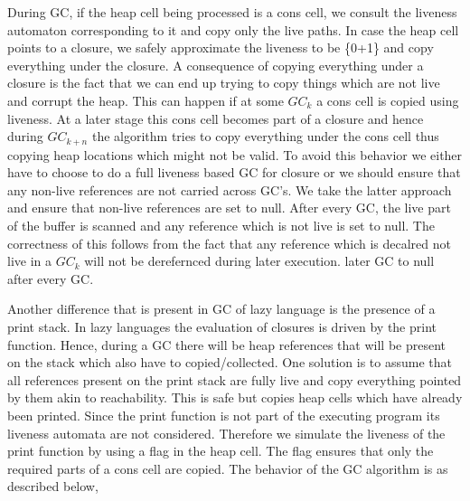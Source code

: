 \documentclass[9pt]{sigplanconf}
\newcommand{\comment}[1]{{\color{Myblue}{(#1)}}}
\begin{document}
\begin{enumerate}
\comment{Mention the fact that liveness at a program point indicates
  what references will be used by the program eventually. The exact
  point where a reference will be used cannot be determined statically
due to the language being lazy. }
During GC, if the heap cell being processed is a cons cell, we consult
the  liveness automaton  corresponding to  it and  copy only  the live
paths.  In  case  the  heap  cell  points  to  a  closure,  we  safely
approximate the  liveness to be {\{0+1\}\*} and  copy everything under
the closure.
A consequence of  copying everything under a closure  is the fact that
we can end up trying to copy things which are not live and corrupt the
heap. This  can happen if at some  $GC_k$ a cons cell  is copied using
liveness. At  a later stage this  cons cell becomes part  of a closure
and  hence during $GC_{k+n}$  the algorithm  tries to  copy everything
under the  cons cell  thus copying heap  locations which might  not be
valid.  To avoid  this behavior we either have to choose  to do a full
liveness based  GC for closure or  we should ensure  that any non-live
references are  not carried across  GC's. We take the  latter approach
and ensure that  non-live references are set to  null. After every GC,
the live part of the buffer  is scanned and any reference which is not
live is  set to null.  The correctness of  this follows from  the fact
that any reference which is decalred  not live in a $GC_k$ will not be
derefernced during later execution.
later GC
to null after every GC.


Another  difference that is  present in  GC of  lazy language  is the
presence  of  a print  stack.  In  lazy  languages the  evaluation  of
closures is  driven by the print  function\comment{Refer to SPJ's
book}.  Hence, during  a GC there
will be heap  references that will be present on  the stack which also
have  to  copied/collected.   One  solution  is  to  assume  that  all
references  present  on  the  print  stack are  fully  live  and  copy
everything pointed  by them  akin to reachability.   This is  safe but
copies heap  cells which  have already been  printed. Since  the print
function is  not part of  the executing program its  liveness automata
are not  considered. Therefore we  simulate the liveness of  the print
function by using a flag in  the heap cell. The flag ensures that only
the required parts  of a cons cell are copied. The  behavior of the GC
algorithm is as described below,


\end{enumerate}
\end{document}
